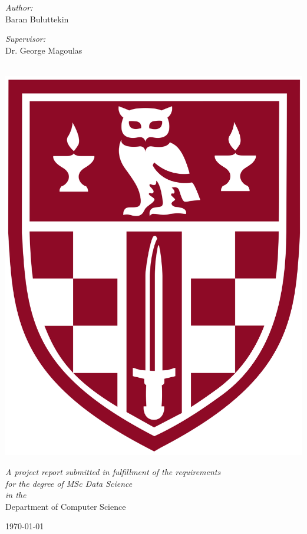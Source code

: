 \documentclass[12pt, twoside, a4paper, openright]{report}
\begin{document}
\begin{titlepage}
\begin{center}
        \begin{minipage}[t]{0.4\textwidth}
        \begin{flushleft} \large
        \emph{Author:}\\
        {Baran Buluttekin}
        \end{flushleft}
        \end{minipage}
        \begin{minipage}[t]{0.4\textwidth}
        \begin{flushright} \large
        \emph{Supervisor:} \\
        {Dr. George Magoulas} 
        \end{flushright}
        \end{minipage}\\
        [2cm] 
        \includegraphics[scale=0.05]{img/birkbeck-shield.png}
            \vfill

            \large \textit{A project report submitted in fulfillment of the requirements\\ for the degree of MSc Data Science}\\[0.3cm] 
            \textit{in the}\\[0.4cm]
            Department of Computer Science\\[2cm] 
 
            \vfill

            {\large \today}\\[4cm] 
 
            \vfill
    \end{center}
\end{titlepage}    
\thispagestyle{empty}
\cleardoublepage
\end{document}
